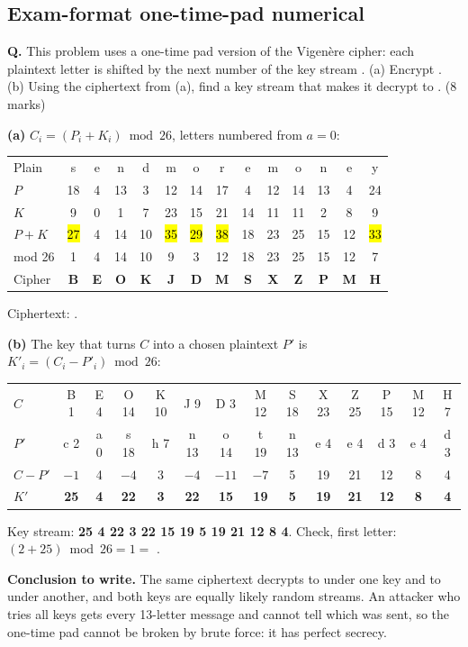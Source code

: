 \subsection{Exam-format one-time-pad numerical}
\begin{worked}
\textbf{Q.} This problem uses a one-time pad version of the Vigen\`ere cipher: each plaintext letter is shifted by the next number of the key stream . (a) Encrypt . (b) Using the ciphertext from (a), find a key stream that makes it decrypt to . (8 marks)

\textbf{(a)} $C_i = (P_i + K_i) \bmod 26$, letters numbered from $a = 0$:
\begin{center}\small\setlength{\tabcolsep}{4pt}
\begin{tabular}{@{}l*{13}{c}@{}}
\toprule
Plain & s&e&n&d&m&o&r&e&m&o&n&e&y\\
$P$ & 18&4&13&3&12&14&17&4&12&14&13&4&24\\
$K$ & 9&0&1&7&23&15&21&14&11&11&2&8&9\\
$P{+}K$ & \hl{27}&4&14&10&\hl{35}&\hl{29}&\hl{38}&18&23&25&15&12&\hl{33}\\
mod 26 & 1&4&14&10&9&3&12&18&23&25&15&12&7\\
Cipher & \textbf{B}&\textbf{E}&\textbf{O}&\textbf{K}&\textbf{J}&\textbf{D}&\textbf{M}&\textbf{S}&\textbf{X}&\textbf{Z}&\textbf{P}&\textbf{M}&\textbf{H}\\
\bottomrule
\end{tabular}
\end{center}
Ciphertext: \textbf{}.

\textbf{(b)} The key that turns $C$ into a chosen plaintext $P'$ is $K'_i = (C_i - P'_i) \bmod 26$:
\begin{center}\small\setlength{\tabcolsep}{3.6pt}
\begin{tabular}{@{}l*{13}{c}@{}}
\toprule
$C$ & B 1&E 4&O 14&K 10&J 9&D 3&M 12&S 18&X 23&Z 25&P 15&M 12&H 7\\
$P'$ & c 2&a 0&s 18&h 7&n 13&o 14&t 19&n 13&e 4&e 4&d 3&e 4&d 3\\
$C - P'$ & $-1$&4&$-4$&3&$-4$&$-11$&$-7$&5&19&21&12&8&4\\
$K'$ & \textbf{25}&\textbf{4}&\textbf{22}&\textbf{3}&\textbf{22}&\textbf{15}&\textbf{19}&\textbf{5}&\textbf{19}&\textbf{21}&\textbf{12}&\textbf{8}&\textbf{4}\\
\bottomrule
\end{tabular}
\end{center}
Key stream: \textbf{25 4 22 3 22 15 19 5 19 21 12 8 4}. Check, first letter: $(2 + 25) \bmod 26 = 1 = $  \checkmark.

\textbf{Conclusion to write.} The same ciphertext decrypts to  under one key and to  under another, and both keys are equally likely random streams. An attacker who tries all keys gets every 13-letter message and cannot tell which was sent, so the one-time pad cannot be broken by brute force: it has perfect secrecy.
\end{worked}

